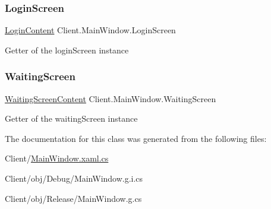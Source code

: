 \subsubsection{\texorpdfstring{Login\+Screen}{LoginScreen}}
{\footnotesize\ttfamily \hyperlink{class_client_1_1_login_content}{Login\+Content} Client.\+Main\+Window.\+Login\+Screen\hspace{0.3cm}{\ttfamily [get]}}

Getter of the login\+Screen instance \mbox{\label{class_client_1_1_main_window_a519660def676d26438ff0f8360ae3808}} 
\subsubsection{\texorpdfstring{Waiting\+Screen}{WaitingScreen}}
{\footnotesize\ttfamily \hyperlink{class_client_1_1_waiting_screen_content}{Waiting\+Screen\+Content} Client.\+Main\+Window.\+Waiting\+Screen\hspace{0.3cm}{\ttfamily [get]}}

Getter of the waiting\+Screen instance 

The documentation for this class was generated from the following files\+:\begin{DoxyCompactItemize}
\item 
Client/\hyperlink{_main_window_8xaml_8cs}{Main\+Window.\+xaml.\+cs}\item 
Client/obj/\+Debug/Main\+Window.\+g.\+i.\+cs\item 
Client/obj/\+Release/Main\+Window.\+g.\+cs\end{DoxyCompactItemize}
